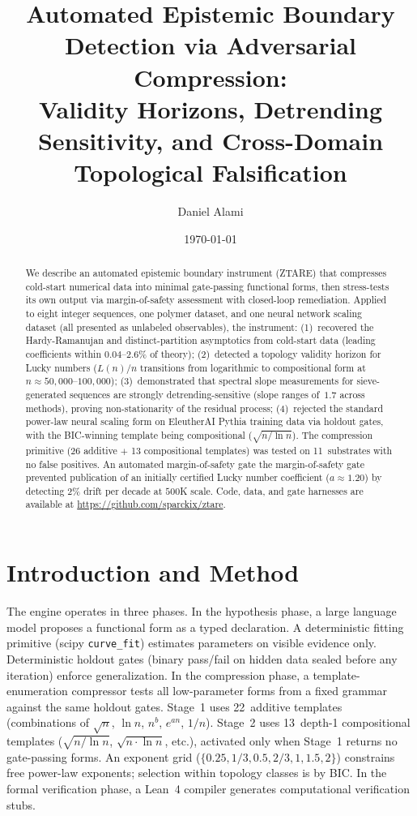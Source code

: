 \documentclass[12pt]{article}
\title{Automated Epistemic Boundary Detection via Adversarial Compression:\\Validity Horizons, Detrending Sensitivity, and Cross-Domain Topological Falsification}
\author{Daniel Alami}
\date{\today}
\begin{document}
\maketitle

\begin{abstract}
We describe an automated epistemic boundary instrument (ZTARE) that compresses cold-start numerical data into minimal gate-passing functional forms, then stress-tests its own output via margin-of-safety assessment with closed-loop remediation. Applied to eight integer sequences, one polymer dataset, and one neural network scaling dataset (all presented as unlabeled observables), the instrument: (1)~recovered the Hardy-Ramanujan and distinct-partition asymptotics from cold-start data (leading coefficients within $0.04$--$2.6\%$ of theory); (2)~detected a topology validity horizon for Lucky numbers ($L(n)/n$ transitions from logarithmic to compositional form at $n \approx 50{,}000$--$100{,}000$); (3)~demonstrated that spectral slope measurements for sieve-generated sequences are strongly detrending-sensitive (slope ranges of~$1.7$ across methods), proving non-stationarity of the residual process; (4)~rejected the standard power-law neural scaling form on EleutherAI Pythia training data via holdout gates, with the BIC-winning template being compositional ($\sqrt{n/\ln n}$). The compression primitive (26 additive $+$ 13 compositional templates) was tested on 11~substrates with no false positives. An automated margin-of-safety gate the margin-of-safety gate prevented publication of an initially certified Lucky number coefficient ($a \approx 1.20$) by detecting 2\% drift per decade at $500$K scale. Code, data, and gate harnesses are available at \url{https://github.com/sparckix/ztare}.
\end{abstract}

\section{Introduction and Method}

The engine operates in three phases. In the hypothesis phase, a large language model proposes a functional form as a typed declaration. A deterministic fitting primitive (scipy \texttt{curve\_fit}) estimates parameters on visible evidence only. Deterministic holdout gates (binary pass/fail on hidden data sealed before any iteration) enforce generalization. In the compression phase, a template-enumeration compressor tests all low-parameter forms from a fixed grammar against the same holdout gates. Stage~1 uses 22~additive templates (combinations of $\sqrt{n}$, $\ln n$, $n^b$, $e^{an}$, $1/n$). Stage~2 uses 13~depth-1 compositional templates ($\sqrt{n/\ln n}$, $\sqrt{n \cdot \ln n}$, etc.), activated only when Stage~1 returns no gate-passing forms. An exponent grid ($\{0.25, 1/3, 0.5, 2/3, 1, 1.5, 2\}$) constrains free power-law exponents; selection within topology classes is by BIC. In the formal verification phase, a Lean~4 compiler generates computational verification stubs.
\end{document}
